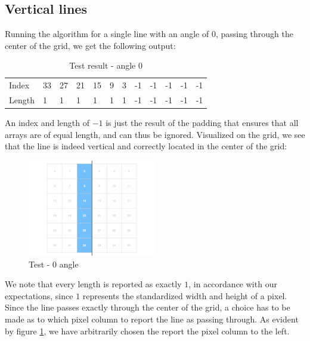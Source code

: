 \subsection*{Vertical lines}
Running the algorithm for a single line with an angle of 0, passing through the center of the grid, we get the following output:
\begin{table}[H]
    \centering
    \caption{Test result - angle 0}
    \begin{tabular}{llllllllllll}
    Index  & 33 & 27 & 21 & 15 & 9 & 3 & -1 & -1 & -1 & -1 & -1 \\
    Length & 1  & 1  & 1  & 1  & 1 & 1 & -1 & -1 & -1 & -1 & -1
    \end{tabular}
\end{table}
An index and length of $-1$ is just the result of the padding that ensures that all arrays are of equal length, and can thus be ignored. Visualized on the grid, we see that the line is indeed vertical and correctly located in the center of the grid:
\begin{figure}[H]
    \centering
    \caption{Test - 0 angle}
    \label{test0}
    \includegraphics[width=0.5\textwidth]{figures/test_0.png}
\end{figure}
We note that every length is reported as exactly $1$, in accordance with our expectations, since $1$ represents the standardized width and height of a pixel.
Since the line passes exactly through the center of the grid, a choice has to be made as to which pixel column to report the line as passing through. As evident by figure \ref{test0}, we have arbitrarily chosen the report the pixel column to the left.\\


